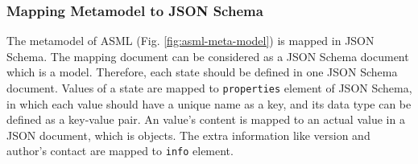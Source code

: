 \subsubsection{Mapping Metamodel to JSON Schema}
The metamodel of ASML (Fig. \ref{fig:asml-meta-model}) is mapped in JSON Schema. The mapping document can be considered as a JSON Schema document which is a model. Therefore, each state should be defined in one JSON Schema document. Values of a state are mapped to \lstinline[basicstyle=\ttfamily]{properties} element of JSON Schema, in which each value should have a unique name as a key, and its data type can be defined as a key-value pair. An value’s content is mapped to an actual value in a JSON document, which is objects. The extra information like version and author’s contact are mapped to \lstinline[basicstyle=\ttfamily]{info} element.

